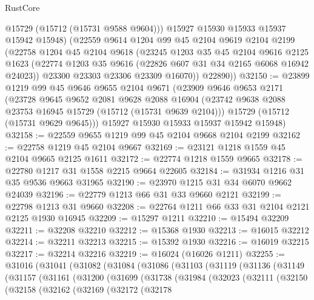 \begin{lexlean}{RustCore}
\begin{coremodule}
          @15729
          (@15712 (@15731 @9588 @9604)))
        @15927
        @15930
        @15933
        @15937
        @15942
        @15948)
      (@22559
        @9614
        @1204
        @99
        @45
        @2104
        @9619
        @2104
        @2199
        (@22758
          @1204
          @45
          @2104
          @9618
          (@23245
            @1203
            @35
            @45
            @2104
            @9616
            @2125
            @1623
            (@22774 @1203 @35 @9616 (@22826 @607 @31 @34 @2165 @6068 @16942 @24023))
            @23300
            @23303
            @23306
            @23309
            @16070))
        @22890))
@32150 := @23899
    @1219
    @99
    @45
    @9646
    @9655
    @2104
    @9671
    (@23909
      @9646
      @9653
      @2171
      (@23728
        @9645
        @9652
        @2081
        @9628
        @2088
        @16904
        (@23742 @9638 @2088 @23753 @16945 @15729 (@15712 (@15731 @9639 @2104)))
        @15729
        (@15712 (@15731 @9629 @9645)))
      @15927
      @15930
      @15933
      @15937
      @15942
      @15948)
@32158 := @22559 @9655 @1219 @99 @45 @2104 @9668 @2104 @2199
@32162 := @22758 @1219 @45 @2104 @9667
@32169 := @23121 @1218 @1559 @45 @2104 @9665 @2125 @1611
@32172 := @22774 @1218 @1559 @9665
@32178 := @22780 @1217 @31 @1558 @2215 @9664 @22605
@32184 := @31934 @1216 @31 @35 @9536 @9663 @31965
@32190 := @23970 @1215 @31 @34 @6070 @9662 @24039
@32196 := @22779 @1213 @66 @31 @33 @9660 @2121
@32199 := @22798 @1213 @31 @9660
@32208 := @22764 @1211 @66 @33 @31 @2104 @2121 @2125 @1930 @16945
@32209 := @15297 @1211
@32210 := @15494 @32209
@32211 := @32208 @32210
@32212 := @15368 @1930
@32213 := @16015 @32212
@32214 := @32211 @32213
@32215 := @15392 @1930
@32216 := @16019 @32215
@32217 := @32214 @32216
@32219 := @16024 (@16026 @1211)
@32255 := @31016
    (@31041
      (@31082
        (@31084
          (@31086
            (@31103
              (@31119
                (@31136
                  (@31149
                    (@31157
                      (@31161
                        (@31200
                          (@31699
                            (@31738
                              (@31984
                                (@32023
                                  (@32111
                                    (@32150
                                      (@32158
                                        (@32162
                                          (@32169
                                            (@32172
                                              (@32178

\end{coremodule}
\end{lexlean}
